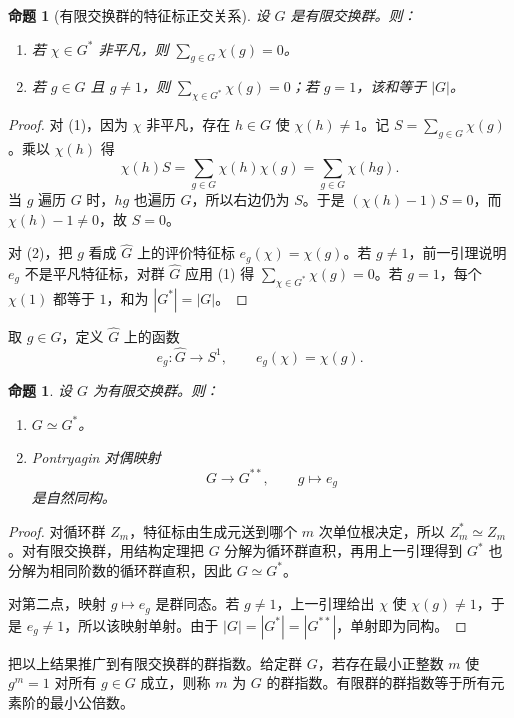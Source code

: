 \documentclass[11pt,a4paper,openany]{ctexbook}
\numberwithin{equation}{chapter}
\theoremstyle{plain}
\newtheorem{proposition}[theorem]{命题}
\theoremstyle{definition}
\theoremstyle{remark}
\begin{document}
\begin{proposition}[有限交换群的特征标正交关系]
设 $G$ 是有限交换群。则：
\begin{enumerate}[label=(\arabic*)]
\item 若 $\chi\in G^*$ 非平凡，则 $\sum_{g\in G}\chi(g)=0$。
\item 若 $g\in G$ 且 $g\ne1$，则 $\sum_{\chi\in G^*}\chi(g)=0$；若 $g=1$，该和等于 $|G|$。
\end{enumerate}
\end{proposition}

\begin{proof}
对 (1)，因为 $\chi$ 非平凡，存在 $h\in G$ 使 $\chi(h)\ne1$。记 $S=\sum_{g\in G}\chi(g)$。乘以 $\chi(h)$ 得
\[
\chi(h)S=\sum_{g\in G}\chi(h)\chi(g)=\sum_{g\in G}\chi(hg).
\]
当 $g$ 遍历 $G$ 时，$hg$ 也遍历 $G$，所以右边仍为 $S$。于是 $(\chi(h)-1)S=0$，而 $\chi(h)-1\ne0$，故 $S=0$。

对 (2)，把 $g$ 看成 $\widehat G$ 上的评价特征标 $e_g(\chi)=\chi(g)$。若 $g\ne1$，前一引理说明 $e_g$ 不是平凡特征标，对群 $\widehat G$ 应用 (1) 得 $\sum_{\chi\in G^*}\chi(g)=0$。若 $g=1$，每个 $\chi(1)$ 都等于 $1$，和为 $|G^*|=|G|$。
\end{proof}

取 $g\in G$，定义 $\widehat G$ 上的函数
\[
e_g:\widehat G\longrightarrow S^1,\qquad e_g(\chi)=\chi(g).
\]

\begin{proposition}
设 $G$ 为有限交换群。则：
\begin{enumerate}[label=(\arabic*)]
\item $G\simeq G^*$。
\item Pontryagin 对偶映射
\[
G\longrightarrow G^{**},\qquad g\longmapsto e_g
\]
是自然同构。
\end{enumerate}
\end{proposition}

\begin{proof}
对循环群 $Z_m$，特征标由生成元送到哪个 $m$ 次单位根决定，所以 $Z_m^*\simeq Z_m$。对有限交换群，用结构定理把 $G$ 分解为循环群直积，再用上一引理得到 $G^*$ 也分解为相同阶数的循环群直积，因此 $G\simeq G^*$。

对第二点，映射 $g\mapsto e_g$ 是群同态。若 $g\ne1$，上一引理给出 $\chi$ 使 $\chi(g)\ne1$，于是 $e_g\ne1$，所以该映射单射。由于 $|G|=|G^*|=|G^{**}|$，单射即为同构。
\end{proof}

把以上结果推广到有限交换群的群指数。给定群 $G$，若存在最小正整数 $m$ 使 $g^m=1$ 对所有 $g\in G$ 成立，则称 $m$ 为 $G$ 的群指数。有限群的群指数等于所有元素阶的最小公倍数。
\end{document}
